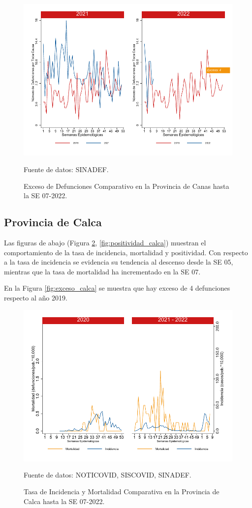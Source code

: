 \documentclass[12pt,a4paper,openany]{book}
\begin{document}
		\begin{figure}[h]
			\caption{Exceso de Defunciones Comparativo en la Provincia de Canas hasta la SE 07-2022.}\label{fig:exceso_canas}
			\begin{center}
				\includegraphics[width=0.7\linewidth]{../figuras/exceso_3.pdf}
			\end{center}
			{\footnotesize {Fuente de datos: SINADEF.}}
		\end{figure}
		
		\clearpage
		
		\subsection*{Provincia de Calca}
		\noindent Las figuras de abajo (Figura \ref{fig:inc_mort_calca}, \ref{fig:positividad_calca}) muestran el comportamiento de la tasa de incidencia, mortalidad y  positividad. Con respecto a la tasa de incidencia se evidencia su tendencia al descenso desde la SE 05, mientras que la tasa de mortalidad ha incrementado en la SE 07.  
		
		En la Figura \ref{fig:exceso_calca} se muestra que hay exceso de 4 defunciones respecto al año 2019.
		
		\begin{figure}[h]
			\caption{Tasa de Incidencia y Mortalidad Comparativa en la Provincia de Calca hasta la SE 07-2022.}\label{fig:inc_mort_calca}
			\begin{center}
				\includegraphics[width=0.85\linewidth]{../figuras/incidencia_mortalidad_20_21_4.pdf}
			\end{center}
			{\footnotesize {Fuente de datos: NOTICOVID, SISCOVID, SINADEF.}}
		\end{figure}
		
\end{document}
